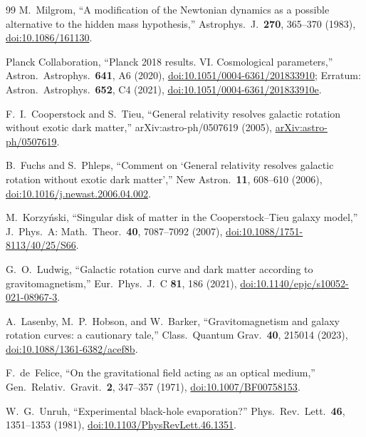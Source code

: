 \documentclass[aps,reprint,amsmath,amssymb,nofootinbib,superscriptaddress,floatfix]{revtex4-2}
\begin{document}
\begin{thebibliography}{99}
M.~Milgrom, ``A modification of the Newtonian dynamics as a possible
alternative to the hidden mass hypothesis,''
Astrophys.\ J.\ \textbf{270}, 365--370 (1983),
\href{https://doi.org/10.1086/161130}{doi:10.1086/161130}.

Planck Collaboration, ``Planck 2018 results. VI. Cosmological
parameters,'' Astron.\ Astrophys.\ \textbf{641}, A6 (2020),
\href{https://doi.org/10.1051/0004-6361/201833910}
{doi:10.1051/0004-6361/201833910};
Erratum: Astron.\ Astrophys.\ \textbf{652}, C4 (2021),
\href{https://doi.org/10.1051/0004-6361/201833910e}
{doi:10.1051/0004-6361/201833910e}.

F.~I.~Cooperstock and S.~Tieu, ``General relativity resolves galactic
rotation without exotic dark matter,'' arXiv:astro-ph/0507619 (2005),
\href{https://arxiv.org/abs/astro-ph/0507619}
{arXiv:astro-ph/0507619}.

B.~Fuchs and S.~Phleps, ``Comment on `General relativity resolves
galactic rotation without exotic dark matter','' New Astron.\
\textbf{11}, 608--610 (2006),
\href{https://doi.org/10.1016/j.newast.2006.04.002}
{doi:10.1016/j.newast.2006.04.002}.

M.~Korzy\'nski, ``Singular disk of matter in the Cooperstock--Tieu
galaxy model,'' J.\ Phys.\ A: Math.\ Theor.\ \textbf{40}, 7087--7092
(2007),
\href{https://doi.org/10.1088/1751-8113/40/25/S66}
{doi:10.1088/1751-8113/40/25/S66}.

G.~O.~Ludwig, ``Galactic rotation curve and dark matter according to
gravitomagnetism,'' Eur.\ Phys.\ J.\ C \textbf{81}, 186 (2021),
\href{https://doi.org/10.1140/epjc/s10052-021-08967-3}
{doi:10.1140/epjc/s10052-021-08967-3}.

A.~Lasenby, M.~P.~Hobson, and W.~Barker, ``Gravitomagnetism and galaxy
rotation curves: a cautionary tale,'' Class.\ Quantum Grav.\
\textbf{40}, 215014 (2023),
\href{https://doi.org/10.1088/1361-6382/acef8b}
{doi:10.1088/1361-6382/acef8b}.

F.~de~Felice, ``On the gravitational field acting as an optical
medium,'' Gen.\ Relativ.\ Gravit.\ \textbf{2}, 347--357 (1971),
\href{https://doi.org/10.1007/BF00758153}{doi:10.1007/BF00758153}.

\bibitem{Unruh1981}
W.~G.~Unruh, ``Experimental black-hole evaporation?''
Phys.\ Rev.\ Lett.\ \textbf{46}, 1351--1353 (1981),
\href{https://doi.org/10.1103/PhysRevLett.46.1351}
{doi:10.1103/PhysRevLett.46.1351}.


\end{thebibliography}
\end{document}

